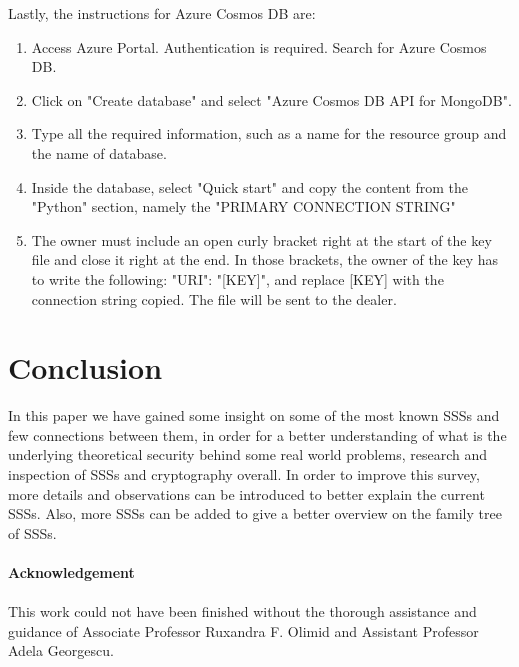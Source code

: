 \documentclass[12pt, a4paper, oneside]{book}
\begin{document}
    Lastly, the instructions for Azure Cosmos DB are:
        \begin{enumerate}
            \item Access Azure Portal. Authentication is required. Search for Azure Cosmos DB.
            \item Click on "Create database" and select "Azure Cosmos DB API for MongoDB".
            \item Type all the required information, such as a name for the resource group and the name of database.
            \item Inside the database, select "Quick start" and copy the content from the "Python" section, namely the "PRIMARY CONNECTION STRING" 
            \item The owner must include an open curly bracket right at the start of the key file and close it right at the end. In those brackets, the owner of the key has to write the following: "URI": "[KEY]", and replace [KEY] with the connection string copied. The file will be sent to the dealer.
        \end{enumerate}
        
    \chapter{Conclusion}
    In this paper we have gained some insight on some of the most known SSSs and few connections between them, in order for a better understanding of what is the underlying theoretical security behind some real world problems, research and inspection of SSSs and cryptography overall. In order to improve this survey, more details and observations can be introduced to better explain the current SSSs. Also, more SSSs can be added to give a better overview on the family tree of SSSs. 
    \vspace{4cm}
    \\~\\
    \textbf{\huge Acknowledgement}
    \vspace{1.3cm}
    \\~\\
    This work could not have been finished without the thorough assistance and guidance of Associate Professor Ruxandra F. Olimid and Assistant Professor Adela Georgescu.
    \newpage
  
  
    


\end{document}
